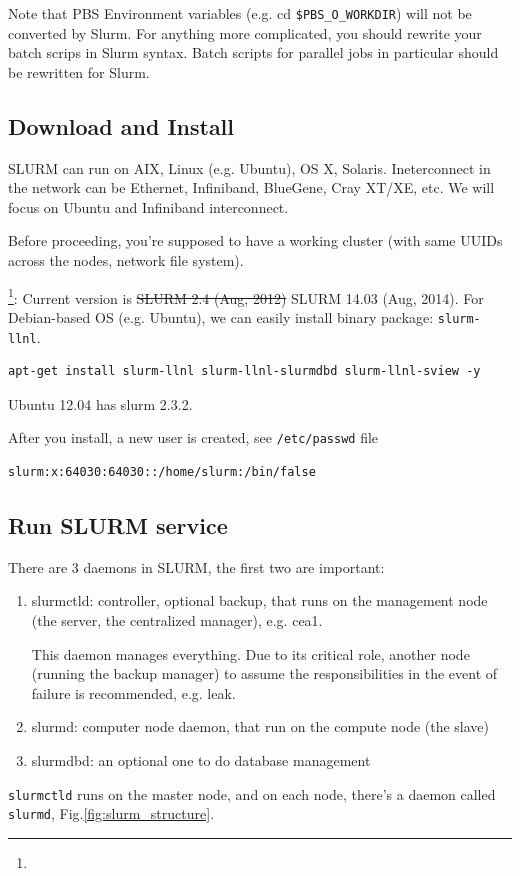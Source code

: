 Note that PBS Environment variables (e.g. cd \verb!$PBS_O_WORKDIR!) will not be
converted by Slurm. For anything more complicated, you should rewrite your batch
scrips in Slurm syntax. Batch scripts for parallel jobs in particular should be
rewritten for Slurm.



\subsection{Download and Install}
\label{sec:SLURM_install}

SLURM can run on AIX, Linux (e.g. Ubuntu), OS X, Solaris. Ineterconnect in the
network can be Ethernet, Infiniband, BlueGene, Cray XT/XE, etc. We will focus on
Ubuntu and Infiniband interconnect. 

Before proceeding, you're supposed to have a working cluster (with same UUIDs
across the nodes, network file system).

\footnote{}: Current version is
\sout{SLURM 2.4 (Aug, 2012)} SLURM 14.03 (Aug, 2014). For Debian-based OS (e.g.
Ubuntu), we can easily install binary package: \verb!slurm-llnl!.
\begin{verbatim}
apt-get install slurm-llnl slurm-llnl-slurmdbd slurm-llnl-sview -y
\end{verbatim}
Ubuntu 12.04 has slurm 2.3.2.

After you install, a new user is created, see \verb!/etc/passwd! file
\begin{verbatim}
slurm:x:64030:64030::/home/slurm:/bin/false
\end{verbatim}

\subsection{Run SLURM service}

There are 3 daemons in SLURM, the first two are important:
\begin{enumerate}
  \item slurmctld: controller, optional backup, that runs on the management node
  (the server, the centralized manager), e.g. cea1.

This daemon manages everything. Due to its
critical role, another node (running the backup manager) to assume the
responsibilities in the event of failure is recommended, e.g. leak.

  \item slurmd: computer node daemon, that run on the compute node (the slave)
  
  \item slurmdbd: an optional one to do database management
\end{enumerate}
\verb!slurmctld! runs on the master node, and on each node, there's a daemon
called \verb!slurmd!, Fig.\ref{fig:slurm_structure}.

